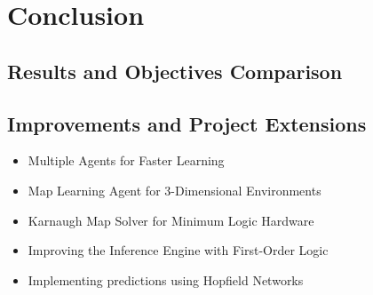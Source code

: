 






\chapter{Conclusion} 
\label{Conclusion}
\section{Results and Objectives Comparison}
\section{Improvements and Project Extensions}

\begin{itemize}
	\item Multiple Agents for Faster Learning
	\item Map Learning Agent for 3-Dimensional Environments
	\item Karnaugh Map Solver for Minimum Logic Hardware
	\item Improving the Inference Engine with First-Order Logic
	\item Implementing predictions using Hopfield Networks
\end{itemize}









